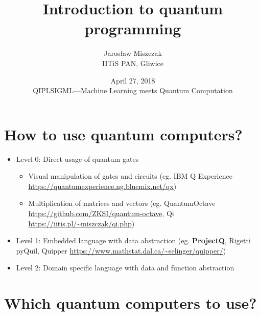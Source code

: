 \documentclass{beamer}
\title{Introduction to quantum programming}
\author{Jaros\l aw Miszczak\\ IITiS PAN, Gliwice}
\date{April 27, 2018\\ QIPLSIGML---Machine Learning meets Quantum Computation}
\begin{document}
\begin{frame}{}
   \maketitle 
\end{frame}

\begin{frame}{}
  \tableofcontents
\end{frame}

\section{How to use quantum computers?}

\begin{frame}{\insertsection}

  \begin{itemize}
    \item Level 0: Direct usage of quantum gates
        \begin{itemize}
            \item Visual manipulation of gates and circuits (eg. IBM Q 
            Experience \url{https://quantumexperience.ng.bluemix.net/qx})
            \item Multiplication of matrices and vectors (eg. QuantumOctave 
            \url{https://github.com/ZKSI/quantum-octave}, Qi 
            \url{https://iitis.pl/~miszczak/qi.php})
        \end{itemize}

    \item Level 1: Embedded language with data abstraction (eg. 
    \textbf{ProjectQ}, Rigetti pyQuil, Quipper 
    \url{https://www.mathstat.dal.ca/~selinger/quipper/})
    
    \item Level 2: Domain specific language with data and function abstraction

  \end{itemize}

\end{frame}

\section{Which quantum computers to use?}
\end{document}
